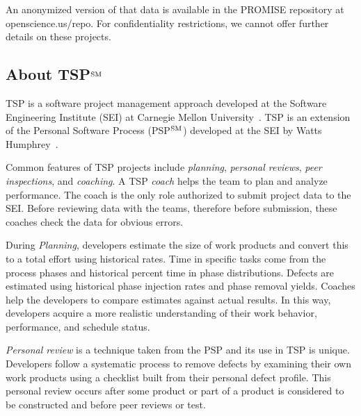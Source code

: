 \documentclass[smallcondensed]{svjour3}
\begin{document}
An anonymized version of that data is available in the PROMISE repository at openscience.us/repo.
For confidentiality restrictions, we cannot offer 
further details on these projects.

\subsection{About TSP$\textsuperscript{SM}$}\label{sect:tsp}

TSP is a software project management approach developed at the Software Engineering Institute (SEI) at Carnegie Mellon University~\cite{tsp00}. TSP is an extension of the Personal Software Process (PSP$\textsuperscript{SM}$) developed at the SEI by Watts Humphrey~\cite{tsp00}.  
 


Common features of TSP projects include {\em planning}, {\em personal reviews}, {\em peer inspections}, and {\em coaching}.
A TSP {\em coach} helps the team to plan and analyze performance. The coach is the only role authorized to submit project data to the SEI.
Before reviewing data with the teams, therefore before submission, these coaches check the data for obvious errors.

During {\em Planning}, developers estimate the size of work products and convert this to a total effort using historical rates. Time in specific tasks come from the  process phases and historical percent time in phase distributions. Defects are estimated using historical phase injection rates and phase removal yields. Coaches help the developers to compare estimates against actual results. In this way, developers acquire a more realistic understanding of their work behavior, performance, and schedule status.

{\em Personal review} is a technique taken from the PSP and its use in TSP is unique.  Developers follow a systematic process to remove defects by  examining their own work products using a checklist built from their personal defect profile. This personal review occurs after some product or part of a product is considered to be constructed and before peer reviews or test. 
\end{document}
